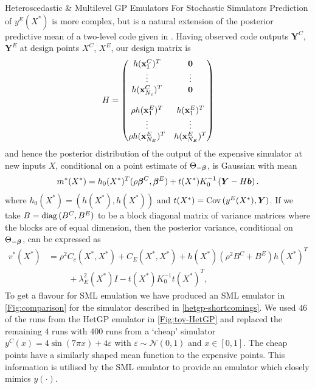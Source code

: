 \begin{chapter}{Heteroscedastic \& Multilevel GP Emulators For Stochastic Simulators\label{Ch:Hetsml}}
Prediction of $y^E(X^{*})$ is more complex, but is a natural extension of the posterior predictive mean of a two-level code given in \cite{Kennedy2000}. Having observed code outputs $\bm{Y}^C$, $\bm{Y}^E$ at design points $X^C$, $X^E$, our design matrix is
\begin{equation}
H = \begin{pmatrix}
h(\mathbf{x}^C_1)^T & \bm{0} \\
\vdots & \vdots \\
h(\mathbf{x}^C_{N_c})^T & \bm{0} \\
 & \\
\rho h(\mathbf{x}^E_1)^T & h(\mathbf{x}^E_1)^T \\
\vdots & \vdots \\
\rho h(\mathbf{x}^E_{N_E})^T & h(\mathbf{x}^E_{N_E})^T
\end{pmatrix}
\end{equation}
and hence the posterior distribution of the output of the expensive simulator at new inputs $X$, conditional on a point estimate of $\Theta_{-\bm{\beta}}$, is Gaussian with mean
\begin{equation}
 m^{*}(X^*) = h_0(X^*)^T (\rho \bm{\beta}^C, \bm{\beta}^E) + t(X^*)K_0^{-1}\left( \bm{Y} - H\bm{b} \right).
\end{equation}
where $h_0(X^*) = ( h(X^*), h(X^*))$ and $t(X^*)=\mathrm{Cov}\,(y^E(X^*), \bm{Y})$. If we take $B = \text{diag}\,(B^C, B^E)$ to be a block diagonal matrix of variance matrices where the blocks are of equal dimension, then the posterior variance, conditional on $\Theta_{-\bm{\beta}}$, can be expressed as
\begin{align}
 v^{*}(X^*) &= \rho^2 C_c(X^*,X^*) + C_E(X^*,X^*) + h(X^*)(\rho^2B^C + B^E)h(X^*)^T \nonumber \\
  &\hspace{1cm}+\lambda^2_E(X^*)I - t(X^*)K_0^{-1}t(X^*)^T,
\end{align}
To get a flavour for SML emulation we have produced an SML emulator in \cref{Fig:comparison} for the simulator described in \cref{hetgp-shortcomings}. We used $46$ of the runs from the HetGP emulator in \cref{Fig:toy-HetGP} and replaced the remaining $4$ runs with $400$ runs from a `cheap' simulator $y^C(x) = 4 \sin (7\pi x) + 4\varepsilon$ with $\varepsilon \sim \mathcal{N}(0,1)$ and $x \in [0,1]$. The cheap points have a similarly shaped mean function to the expensive points. This information is utilised by the SML emulator to provide an emulator which closely mimics $y(\cdot)$.
\begin{figure}[ht]
\centering

\end{figure}
\end{chapter}
